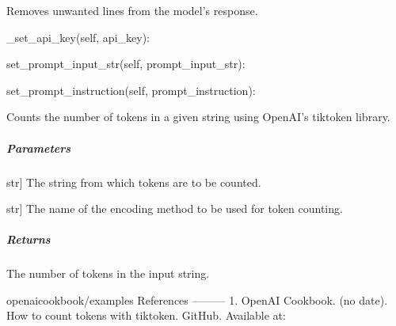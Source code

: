 \documentclass[letterpaper,10pt,english]{sphinxmanual}
\begin{document}
\begin{fulllineitems}
\begin{description}
\sphinxAtStartPar
Removes unwanted lines from the model’s response.

\end{description}

\sphinxAtStartPar
\_set\_api\_key(self, api\_key):

\sphinxAtStartPar
set\_prompt\_input\_str(self, prompt\_input\_str):

\sphinxAtStartPar
set\_prompt\_instruction(self, prompt\_instruction):

\begin{fulllineitems}
\label{\detokenize{main.ai_language_model.models:main.ai_language_model.models.gpt_3_5_turbo.GPT3_5TurboModel.get_num_tokens_from_response}}
\pysigstartsignatures
{}
\pysigstopsignatures
\sphinxAtStartPar
Counts the number of tokens in a given string using OpenAI’s tiktoken library.


\subparagraph{Parameters}
\label{\detokenize{main.ai_language_model.models:parameters}}\begin{description}
\sphinxlineitem{string}{[}str{]}
\sphinxAtStartPar
The string from which tokens are to be counted.

\sphinxlineitem{encoding\_name}{[}str{]}
\sphinxAtStartPar
The name of the encoding method to be used for token counting.

\end{description}


\subparagraph{Returns}
\label{\detokenize{main.ai_language_model.models:returns}}\begin{description}
\sphinxAtStartPar
The number of tokens in the input string.

\end{description}

\sphinxAtStartPar
openai\sphinxhyphen{}cookbook/examples
References
———\sphinxhyphen{}
1. OpenAI Cookbook. (no date). How to count tokens with tiktoken. GitHub. Available at:
\begin{quote}


\end{quote}
\end{fulllineitems}
\end{fulllineitems}
\end{document}
